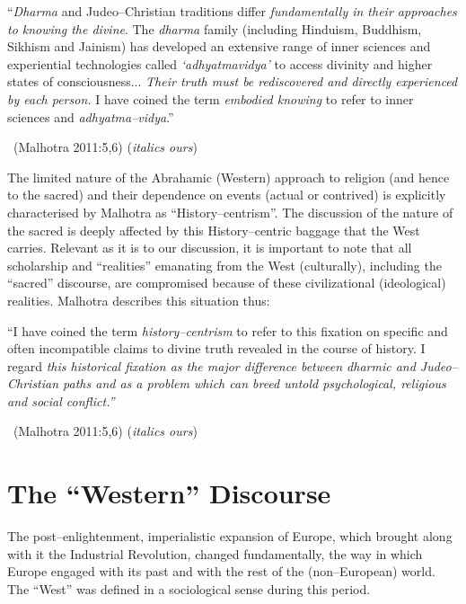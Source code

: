 \begin{myquote}
“\textit{Dharma} and Judeo–Christian traditions differ \textit{fundamentally in their approaches to knowing the divine}. The \textit{dharma} family (including Hinduism, Buddhism, Sikhism and Jainism) has developed an extensive range of inner sciences and experiential technologies called \textit{‘adhyatmavidya’} to access divinity and higher states of consciousness... \textit{Their truth must be rediscovered and directly experienced by each person.} I have coined the term \textit{embodied knowing} to refer to inner sciences and \textit{adhyatma–vidya}.” 

~\hfill (Malhotra 2011:5,6) (\textit{italics ours})
\end{myquote}

The limited nature of the Abrahamic (Western) approach to religion (and hence to the sacred) and their dependence on events (actual or contrived) is explicitly characterised by Malhotra as “History–centrism”. The discussion of the nature of the sacred is deeply affected by this History–centric baggage that the West carries. Relevant as it is to our discussion, it is important to note that all scholarship and “realities” emanating from the West (culturally), including the “sacred” discourse, are compromised because of these civilizational (ideological) realities. Malhotra describes this situation thus:

\begin{myquote}
“I have coined the term \textit{history–centrism} to refer to this fixation on specific and often incompatible claims to divine truth revealed in the course of history. I regard \textit{this historical fixation as the major difference between dharmic and Judeo–Christian paths and as a problem which can breed untold psychological, religious and social conflict.”} 

~\hfill (Malhotra 2011:5,6) (\textit{italics ours})
\end{myquote}


\section*{The “Western” Discourse}

The post–enlightenment, imperialistic expansion of Europe, which brought along with it the Industrial Revolution, changed fundamentally, the way in which Europe engaged with its past and with the rest of the (non–European) world. The “West” was defined in a sociological sense during this period.

